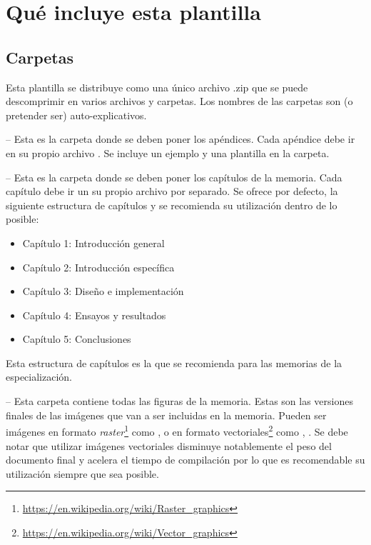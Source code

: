 
\section{Qué incluye esta plantilla}

\subsection{Carpetas}

Esta plantilla se distribuye como una único archivo .zip que se puede descomprimir en varios archivos y carpetas. Los nombres de las carpetas son (o pretender ser) auto-explicativos.

 -- Esta es la carpeta donde se deben poner los apéndices. Cada apéndice debe ir en su propio archivo . Se incluye un ejemplo y una plantilla en la carpeta.

 -- Esta es la carpeta donde se deben poner los capítulos de la memoria. Cada capítulo debe ir un su propio archivo  por separado.  Se ofrece por defecto, la siguiente estructura de capítulos y se recomienda su utilización dentro de lo posible:

\begin{itemize}
\item Capítulo 1: Introducción general	
\item Capítulo 2: Introducción específica
\item Capítulo 3: Diseño e implementación
\item Capítulo 4: Ensayos y resultados
\item Capítulo 5: Conclusiones

\end{itemize}

Esta estructura de capítulos es la que se recomienda para las memorias de la especialización.

 -- Esta carpeta contiene todas las figuras de la memoria.  Estas son las versiones finales de las imágenes que van a ser incluidas en la memoria.  Pueden ser imágenes en formato \textit{raster}\footnote{\url{https://en.wikipedia.org/wiki/Raster_graphics}} como ,  o en formato vectoriales\footnote{\url{https://en.wikipedia.org/wiki/Vector_graphics}} como , .  Se debe notar que utilizar imágenes vectoriales disminuye notablemente el peso del documento final y acelera el tiempo de compilación por lo que es recomendable su utilización siempre que sea posible.

